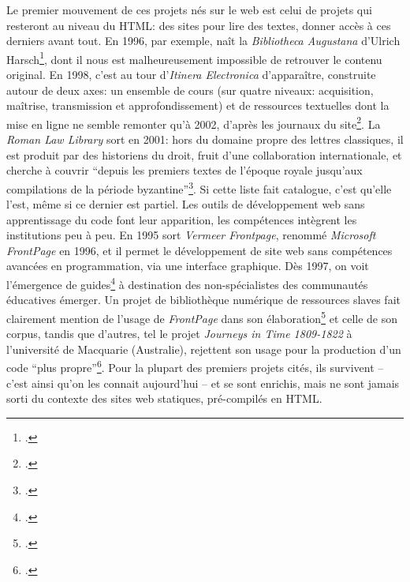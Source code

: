 Le premier mouvement de ces projets nés sur le web est celui de projets qui resteront au niveau du HTML: des sites pour lire des textes, donner accès à ces derniers avant tout. En 1996, par exemple, naît la \textit{Bibliotheca Augustana} d'Ulrich Harsch\footcite{harsch_bibliotheca_nodate}, dont il nous est malheureusement impossible de retrouver le contenu original. En 1998, c'est au tour d'\textit{Itinera Electronica} d'apparaître, construite autour de deux axes: un ensemble de cours (sur quatre niveaux: acquisition, maîtrise, transmission et approfondissement) et de ressources textuelles dont la mise en ligne ne semble remonter qu'à 2002, d'après les journaux du site\footcite{meurant_itinera_nodate}. La \textit{Roman Law Library} sort en 2001: hors du domaine propre des lettres classiques, il est produit par des historiens du droit, fruit d'une collaboration internationale, et cherche à couvrir ``depuis les premiers textes de l'époque royale jusqu'aux compilations de la période byzantine''\footcite{lassard_roman_2001}. Si cette liste fait catalogue, c'est qu'elle l'est, même si ce dernier est partiel. Les outils de développement web sans apprentissage du code font leur apparition, les compétences intègrent les institutions peu à peu. En 1995 sort \textit{Vermeer Frontpage}, renommé \textit{Microsoft FrontPage} en 1996, et il permet le développement de site web sans compétences avancées en programmation, via une interface graphique. Dès 1997, on voit l'émergence de guides\footcite{la1997guide} à destination des non-spécialistes des communautés éducatives émerger. Un projet de bibliothèque numérique de ressources slaves fait clairement mention de l'usage de \textit{FrontPage} dans son élaboration\footcite{deyrup1998character} et celle de son corpus, tandis que d'autres, tel le projet \textit{Journeys in Time 1809-1822} à l'université de Macquarie (Australie), rejettent son usage pour la production d'un code ``plus propre''\footcite[p.~41]{10.3316/informit.752609435027594}. Pour la plupart des premiers projets cités, ils survivent -- c'est ainsi qu'on les connait aujourd'hui -- et se sont enrichis, mais ne sont jamais sorti du contexte des sites web statiques, pré-compilés en HTML.

